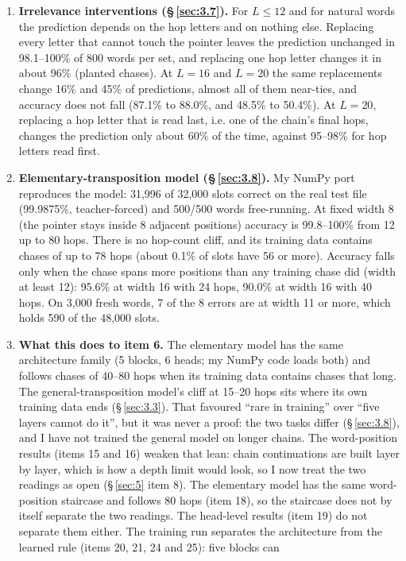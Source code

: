 \documentclass[paper=a4,fontsize=11pt,DIV=11,parskip=half,headings=small,numbers=noendperiod]{scrartcl}
\DeclareRobustCommand{\lead}[1]{\textsf{\bfseries\color{accent}#1}}
\begin{document}
\begin{enumerate}
\item \lead{Irrelevance interventions (\S\,\ref{sec:3.7}).} For $L\le 12$ and for natural words the prediction
  depends on the hop letters and on nothing else. Replacing every letter that cannot touch the pointer leaves
  the prediction unchanged in 98.1–100\% of 800 words per set, and replacing one hop letter changes it in about
  96\% (planted chases). At $L=16$ and $L=20$ the same replacements change 16\% and 45\% of predictions, almost
  all of them near-ties, and accuracy does not fall (87.1\% to 88.0\%, and 48.5\% to 50.4\%). At $L=20$,
  replacing a hop letter that is read last, i.e. one of the chain’s final hops, changes the prediction only
  about 60\% of the time, against 95–98\% for hop letters read first.
\item \lead{Elementary-transposition model (\S\,\ref{sec:3.8}).} My NumPy port reproduces the model: 31,996 of
  32,000 slots correct on the real test file (99.9875\%, teacher-forced) and 500/500 words free-running. At
  fixed width 8 (the pointer stays inside 8 adjacent positions) accuracy is 99.8–100\% from 12 up to 80 hops.
  There is no hop-count cliff, and its training data contains chases of up to 78 hops (about 0.1\% of slots have
  56 or more). Accuracy falls only when the chase spans more positions than any training chase did (width at
  least 12): 95.6\% at width 16 with 24 hops, 90.0\% at width 16 with 40 hops. On 3,000 fresh words, 7 of the 8
  errors are at width 11 or more, which holds 590 of the 48,000 slots.
\item \lead{What this does to item 6.} The elementary model has the same architecture family (5 blocks, 6 heads;
  my NumPy code loads both) and follows chases of 40–80 hops when its training data contains chases that long.
  The general-transposition model’s cliff at 15–20 hops sits where its own training data ends
  (\S\,\ref{sec:3.3}). That favoured “rare in training” over “five layers cannot do it”, but it was never a
  proof: the two tasks differ (\S\,\ref{sec:3.8}), and I have not trained the general model on longer chains.
  The word-position results (items 15 and 16) weaken that lean: chain continuations are built layer by layer,
  which is how a depth limit would look, so I now treat the two readings as open (\S\,\ref{sec:5} item 8). The
  elementary model has the same word-position staircase and follows 80 hops (item 18), so the staircase does not
  by itself separate the two readings. The head-level results (item 19) do not separate them either. The
  training run separates the architecture from the learned rule (items 20, 21, 24 and 25): five blocks can

\end{enumerate}
\end{document}
